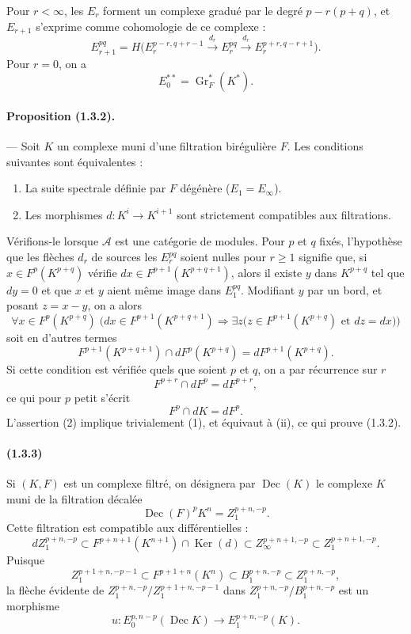\documentclass[10pt]{article}
\newcommand{\Gr}{\operatorname{Gr}}
\newcommand{\Ker}{\operatorname{Ker}}
\newcommand{\calA}{\mathcal A}
\newcommand{\Dec}{\operatorname{Dec}}
\begin{document}
Pour $r<\infty$, les $E_r$ forment un complexe gradué par le degré $p-r(p+q)$, et $E_{r+1}$ s'exprime comme cohomologie de ce complexe :
\[
\tag{1.3.1.5}
E_{r+1}^{pq}=H\bigl(E_r^{p-r,q+r-1}\xrightarrow{d_r}E_r^{pq}\xrightarrow{d_r}E_r^{p+r,q-r+1}\bigr).
\]
Pour $r=0$, on a
\[
\tag{1.3.1.6}
E_0^{**}=\Gr_F^*(K^*).
\]

\paragraph{Proposition (1.3.2).} --- Soit $K$ un complexe muni d'une filtration birégulière $F$. Les conditions suivantes sont équivalentes :
\begin{enumerate}[label=(\roman*)]
\item La suite spectrale définie par $F$ dégénère ($E_1=E_\infty$).
\item Les morphismes $d:K^i\to K^{i+1}$ sont strictement compatibles aux filtrations.
\end{enumerate}
Vérifions-le lorsque $\calA$ est une catégorie de modules. Pour $p$ et $q$ fixés, l'hypothèse que les flèches $d_r$ de sources les $E_r^{pq}$ soient nulles pour $r\geq 1$ signifie que, si $x\in F^p(K^{p+q})$ vérifie $dx\in F^{p+1}(K^{p+q+1})$, alors il existe $y$ dans $K^{p+q}$ tel que $dy=0$ et que $x$ et $y$ aient même image dans $E_1^{pq}$. Modifiant $y$ par un bord, et posant $z=x-y$, on a alors
\[
\forall x\in F^p(K^{p+q})\;\bigl(dx\in F^{p+1}(K^{p+q+1})\Rightarrow
\exists z\bigl(z\in F^{p+1}(K^{p+q})\text{ et }dz=dx\bigr)\bigr)
\]
soit en d'autres termes
\[
\tag{1}
F^{p+1}(K^{p+q+1})\cap dF^p(K^{p+q})=dF^{p+1}(K^{p+q}).
\]
Si cette condition est vérifiée quels que soient $p$ et $q$, on a par récurrence sur $r$
\[
F^{p+r}\cap dF^p=dF^{p+r},
\]
ce qui pour $p$ petit s'écrit
\[
\tag{2}
F^p\cap dK=dF^p.
\]
L'assertion (2) implique trivialement (1), et équivaut à (ii), ce qui prouve (1.3.2).

\paragraph{(1.3.3)} Si $(K,F)$ est un complexe filtré, on désignera par $\Dec(K)$ le complexe $K$ muni de la filtration décalée
\[
\Dec(F)^pK^n=Z_1^{p+n,-p}.
\]
Cette filtration est compatible aux différentielles :
\[
dZ_1^{p+n,-p}\subset F^{p+n+1}(K^{n+1})\cap\Ker(d)
       \subset Z_\infty^{p+n+1,-p}\subset Z_1^{p+n+1,-p}.
\]
Puisque
\[
\tag{1.3.3.1}
Z_1^{p+1+n,-p-1}\subset F^{p+1+n}(K^n)\subset B_1^{p+n,-p}\subset Z_1^{p+n,-p},
\]
la flèche évidente de $Z_1^{p+n,-p}/Z_1^{p+1+n,-p-1}$ dans $Z_1^{p+n,-p}/B_1^{p+n,-p}$ est un morphisme
\[
\tag{1.3.3.2}
u:E_0^{p,n-p}(\Dec K)\longrightarrow E_1^{p+n,-p}(K).
\]
\end{document}
